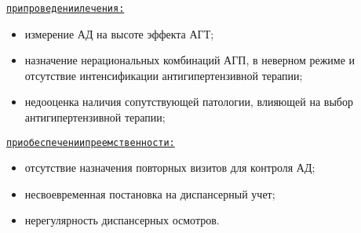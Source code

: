 \documentclass{article}%
\begin{document}
\newline%
\begin{alltt}
\underline{при проведении лечения:}
\end{alltt}%
\begin{itemize}%
\item%
измерение АД на высоте эффекта АГТ;%
\item%
назначение нерациональных комбинаций АГП, в неверном режиме и отсутствие интенсификации антигипертензивной терапии;%
\item%
недооценка наличия сопутствующей патологии, влияющей на выбор антигипертензивной терапии;%
\end{itemize}%
\newline%
\begin{alltt}
\underline{при обеспечении преемственности:}
\end{alltt}%
\begin{itemize}%
\item%
отсутствие назначения повторных визитов для контроля АД;%
\item%
несвоевременная постановка на диспансерный учет;%
\item%
нерегулярность диспансерных осмотров.%
\end{itemize}

%
\end{document}
